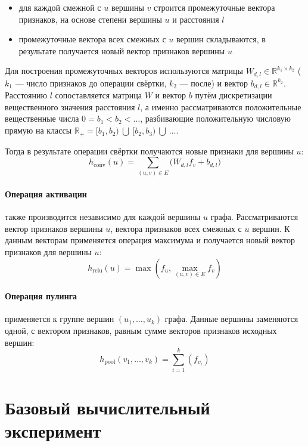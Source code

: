 \documentclass[12pt,twoside]{article}
\begin{document}
\begin{itemize}
\item для каждой смежной с $u$ вершины $v$ строится промежуточные вектора признаков, на основе степени вершины $u$ и расстояния $l$
\item промежуточные вектора всех смежных с $u$ вершин складываются, в результате получается новый вектор признаков вершины $u$
\end{itemize}

Для построения промежуточных векторов используются матрицы $W_{d,l} \in \mathbb{R}^{k_1 \times k_2}$ ($k_1$ --- число признаков до операции свёртки, $k_2$ --- после) и вектор $b_{d,l} \in \mathbb{R}^{k_2}$. Расстоянию $l$ сопоставляется матрица $W$ и вектор $b$ путём дискретизации вещественного значения расстояния $l$, а именно рассматриваются положительные вещественные числа $0 = b_1 < b_2 < \ldots $, разбивающие положительную числовую прямую на классы $\mathbb{R}_+ = [b_1, b_2)\ \bigcup\ [b_2, b_3)\ \bigcup\ \ldots$.

Тогда в результате операции свёртки получаются новые признаки для вершины $u$:
$$h_{\text{conv}}(u) = \sum_{(u, v) \in E} \big(W_{d,l} f_v + b_{d,l}\big)$$

\paragraph{Операция активации} также производится независимо для каждой вершины $u$ графа. Рассматриваются вектор признаков вершины $u$, вектора признаков всех смежных с $u$ вершин. К данным векторам применяется операция максимума и получается новый вектор признаков для вершины $u$:
$$h_{\text{relu}}(u) = \max(f_u, \max_{(u,v) \in E} f_v)$$

\paragraph{Операция пулинга} применяется к группе вершин $(u_1, \ldots, u_k)$ графа. Данные вершины заменяются одной, с вектором признаков, равным сумме векторов признаков исходных вершин:
$$h_{\text{pool}}(v_1, \ldots, v_k) = \sum_{i=1}^k(f_{v_i})$$


\section{Базовый вычислительный эксперимент}
\end{document}
